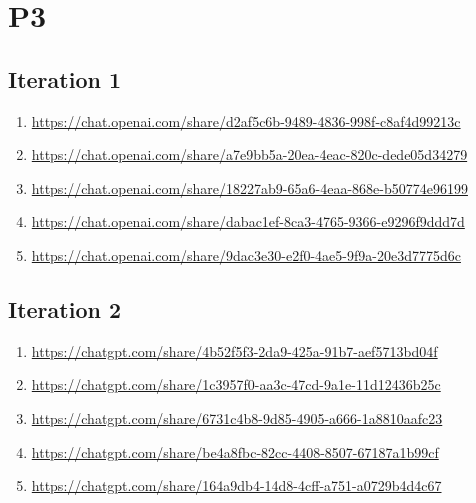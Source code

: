\section{P3\label{P3-1}}

\subsection{Iteration 1}

\begin{enumerate}
    \item \href{https://chat.openai.com/share/d2af5c6b-9489-4836-998f-c8af4d99213c}{https://chat.openai.com/share/d2af5c6b-9489-4836-998f-c8af4d99213c}
    \item \href{https://chat.openai.com/share/a7e9bb5a-20ea-4eac-820c-dede05d34279}{https://chat.openai.com/share/a7e9bb5a-20ea-4eac-820c-dede05d34279}
    \item \href{https://chat.openai.com/share/18227ab9-65a6-4eaa-868e-b50774e96199}{https://chat.openai.com/share/18227ab9-65a6-4eaa-868e-b50774e96199}
    \item \href{https://chat.openai.com/share/dabac1ef-8ca3-4765-9366-e9296f9ddd7d}{https://chat.openai.com/share/dabac1ef-8ca3-4765-9366-e9296f9ddd7d}
    \item \href{https://chat.openai.com/share/9dac3e30-e2f0-4ae5-9f9a-20e3d7775d6c}{https://chat.openai.com/share/9dac3e30-e2f0-4ae5-9f9a-20e3d7775d6c}
\end{enumerate}

\subsection{Iteration 2}

\begin{enumerate}
    \item \href{https://chatgpt.com/share/4b52f5f3-2da9-425a-91b7-aef5713bd04f}{https://chatgpt.com/share/4b52f5f3-2da9-425a-91b7-aef5713bd04f}
    \item \href{https://chatgpt.com/share/1c3957f0-aa3c-47cd-9a1e-11d12436b25c}{https://chatgpt.com/share/1c3957f0-aa3c-47cd-9a1e-11d12436b25c}
    \item \href{https://chatgpt.com/share/6731c4b8-9d85-4905-a666-1a8810aafc23}{https://chatgpt.com/share/6731c4b8-9d85-4905-a666-1a8810aafc23}
    \item \href{https://chatgpt.com/share/be4a8fbc-82cc-4408-8507-67187a1b99cf}{https://chatgpt.com/share/be4a8fbc-82cc-4408-8507-67187a1b99cf}
    \item \href{https://chatgpt.com/share/164a9db4-14d8-4cff-a751-a0729b4d4c67}{https://chatgpt.com/share/164a9db4-14d8-4cff-a751-a0729b4d4c67}
\end{enumerate}

